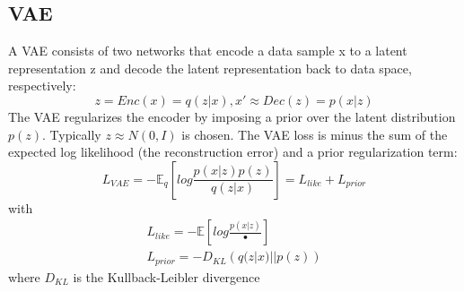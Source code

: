 \subsection{VAE}
A VAE\cite{kingma2013auto} consists of two networks that encode a data sample x to a latent representation z and decode the latent representation back to data space, respectively:
\begin{equation}
	z = Enc(x) = q(z|x), x' \approx Dec(z) = p(x|z)
\end{equation}
The VAE regularizes the encoder by imposing a prior over the latent distribution $p(z)$. Typically $z \approx N (0, I)$ is chosen. The VAE loss is minus the sum of the expected log likelihood (the reconstruction error) and a prior regularization term:
\begin{equation}
	L_{VAE} = - \mathbb{E}_{q}\left[ log \frac{p(x|z)p(z)}{q(z|x)}\right] = L_{like} + L_{prior}
\end{equation}
with
\begin{align}
	L_{like} = - \mathbb{E}\left[log\frac{p(x|z)}{•}\right]\\
	L_{prior} = - D_{KL}\left(q(z|x)||p(z)\right)
\end{align}
where $D_{KL}$ is the Kullback-Leibler divergence